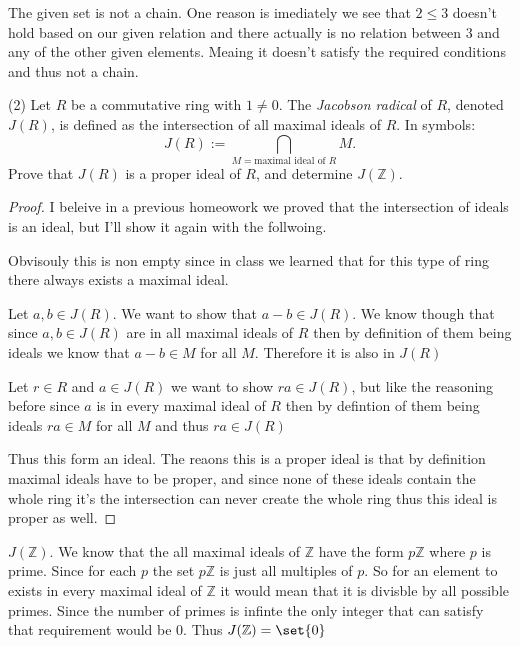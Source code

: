 \documentclass[12pt]{article}
\DeclarePairedDelimiter\set\{\}
\newcommand      {\Z}         {{\mathbb Z}}
\begin{document}
The given set is not a chain. One reason is imediately we see that $2\leq 3$ doesn't hold based on our given relation and there actually is no relation between 3 and any of the other given elements. Meaing it doesn't satisfy the required conditions and thus not a chain. 

\newpage
(2) Let $R$ be a commutative ring with $1\neq 0$. The \textit{Jacobson radical} of $R$, denoted $J(R)$, is defined as the intersection of all maximal ideals of $R$. In symbols:
\begin{equation*}
	J(R):=\bigcap_{M=\text{maximal ideal of }R} M.
\end{equation*}
Prove that $J(R)$ is a proper ideal of $R$, and determine $J(\Z)$.
\begin{proof}
	I beleive in a previous homeowork we proved that the intersection of ideals is an ideal, but I'll show it again with the follwoing. 

	Obvisouly this is non empty since in class we learned that for this type of ring there always exists a maximal ideal. 

	Let $a,b \in J(R)$. We want to show that $a-b \in J(R)$. We know though that since $a,b\in J(R)$ are in all maximal ideals of $R$ then by definition of them being ideals we know that $a-b \in M$ for all $M$. Therefore it is also in $J(R)$

	Let $r \in R$ and $a\in J(R)$ we want to show $ra \in J(R)$, but like the reasoning before since $a$ is in every maximal ideal of $R$ then by defintion of them being ideals $ra \in M$ for all $M$ and thus $ra\in J(R)$ 

	Thus this form an ideal. The reaons this is a proper ideal is that by definition maximal ideals have to be proper, and since none of these ideals contain the whole ring it's the intersection can never create the whole ring thus this ideal is proper as well. 
\end{proof}

$J(\Z)$. We know that the all maximal ideals of $\Z$ have the form $p\Z$ where $p$ is prime. Since for each $p$ the set $p\Z$ is just all multiples of $p$. So for an element to exists in every maximal ideal of $\Z$ it would mean that it is divisble by all possible primes. Since the number of primes is infinte the only integer that can satisfy that requirement would be $0$. Thus $J(\Z) = \set{0}$
\end{document}
